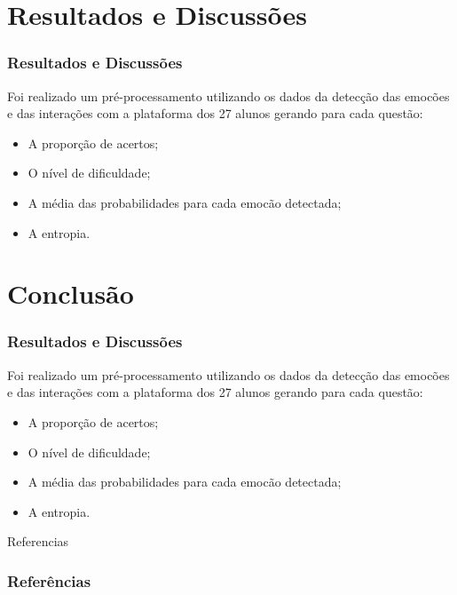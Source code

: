 \documentclass{beamer}
\begin{document}
\section{Resultados e Discuss\~oes}
\begin{frame}
\frametitle{Resultados e Discuss\~oes}
\pause
Foi realizado um pr\'{e}-processamento utilizando os dados da detec\c{c}\~ao das emoc\~oes e das intera\c{c}\~oes com a plataforma dos 27 alunos 
gerando para cada quest\~ao:

\begin{itemize}
\pause
\item A propor\c{c}\~ao de acertos;
\pause
\item O n\'{i}vel de dificuldade;
\pause
\item A m\'{e}dia das probabilidades para cada emoc\~ao detectada;
\pause
\item A entropia.
\end{itemize}

\end{frame}





\section{Conclusão}
\begin{frame}
\frametitle{Resultados e Discuss\~oes}
\pause
Foi realizado um pr\'{e}-processamento utilizando os dados da detec\c{c}\~ao das emoc\~oes e das intera\c{c}\~oes com a plataforma dos 27 alunos 
gerando para cada quest\~ao:

\begin{itemize}
\pause
\item A propor\c{c}\~ao de acertos;
\pause
\item O n\'{i}vel de dificuldade;
\pause
\item A m\'{e}dia das probabilidades para cada emoc\~ao detectada;
\pause
\item A entropia.
\end{itemize}

\end{frame}




\begin{frame}{Referencias}
\frametitle{Refer\^encias}
    \tiny{ }
    
\end{frame}
\end{document}
